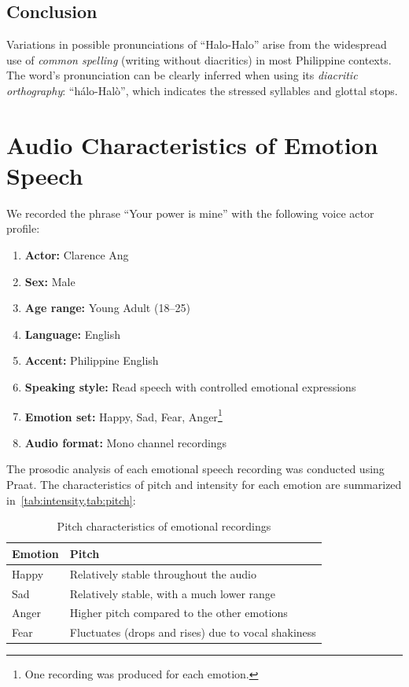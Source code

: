 \documentclass{article}
\begin{document}
	\subsection{Conclusion}
	
	Variations in possible pronunciations of ``Halo-Halo'' arise from the
	widespread use of \emph{common spelling} (writing without diacritics) in most
	Philippine contexts. The word's pronunciation can be clearly inferred when
	using its \emph{diacritic orthography}: ``h\'alo-Hal\`o'', which indicates the
	stressed syllables and glottal stops.
	
	\section{Audio Characteristics of Emotion Speech}
	
	We recorded the phrase ``Your power is mine'' with the following voice actor
	profile:
	
	\begin{enumerate}
		\item \textbf{Actor:} Clarence Ang
		\item \textbf{Sex:} Male
		\item \textbf{Age range:} Young Adult (18--25)
		\item \textbf{Language:} English
		\item \textbf{Accent:} Philippine English
		\item \textbf{Speaking style:} Read speech with controlled emotional expressions
		\item \textbf{Emotion set:} Happy, Sad, Fear, Anger\footnote{One recording was produced for each emotion.}
		\item \textbf{Audio format:} Mono channel recordings
	\end{enumerate}
	
	The prosodic analysis of each emotional speech recording was conducted using
	Praat. The characteristics of pitch and intensity for each emotion are
	summarized in~\cref{tab:intensity,tab:pitch}:
	
	\begin{table}[h]
		\centering
		\caption{Pitch characteristics of emotional recordings}
		\begin{tabular}{ll}
			\hline
			\textbf{Emotion} & \textbf{Pitch}                                      \\
			\hline
			Happy            & Relatively stable throughout the audio              \\
			Sad              & Relatively stable, with a much lower range          \\
			Anger            & Higher pitch compared to the other emotions         \\
			Fear             & Fluctuates (drops and rises) due to vocal shakiness \\
			\hline
		\end{tabular}\label{tab:pitch}
	\end{table}
	
\end{document}
